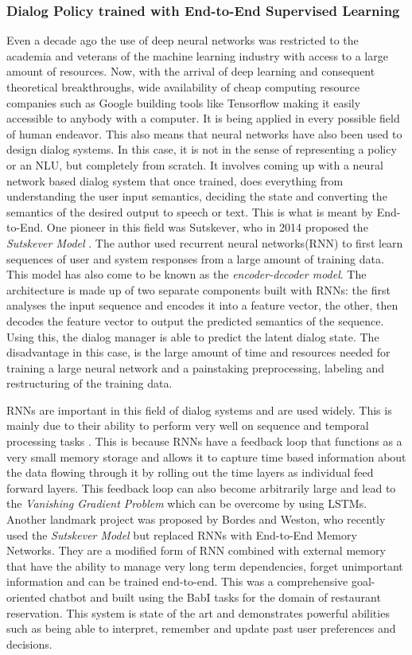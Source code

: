 \documentclass[14pt]{extarticle}
\numberwithin{equation}{section}
\begin{document}
	\subsubsection{Dialog Policy trained with End-to-End Supervised Learning}
	Even a decade ago the use of deep neural networks was restricted to the academia and veterans of the machine learning industry with access to a large amount of resources. Now, with the arrival of deep learning and consequent theoretical breakthroughs, wide availability of cheap computing resource companies such as Google building tools like Tensorflow\cite{tensorflow} making it easily accessible to anybody with a computer. It is being applied in every possible field of human endeavor. This also means that neural networks have also been used to design dialog systems. In this case, it is not in the sense of representing a policy or an NLU, but completely from scratch. It involves coming up with a neural network based dialog system that once trained, does everything from understanding the user input semantics, deciding the state and converting the semantics of the desired output to speech or text. This is what is meant by End-to-End. One pioneer in this field was Sutskever, who in 2014 proposed the \textit{Sutskever Model} \cite{Sutskever_seq_2seq}. The author used recurrent neural networks(RNN) to first learn sequences of user and system responses from a large amount of training data. This model has also come to be known as the \textit{encoder-decoder model}. The architecture is made up of two separate components built with RNNs: the first analyses the input sequence and encodes it into a feature vector, the other, then decodes the feature vector to output the predicted semantics of the sequence. Using this, the dialog manager is able to predict the latent dialog state. The disadvantage in this case, is the large amount of time and resources needed for training a large neural network and a painstaking preprocessing, labeling and restructuring of the training data.
	
	RNNs are important in this field of dialog systems and are used widely. This is mainly due to their ability to perform very well on sequence and temporal processing tasks \cite{karpathy_rnn}. This is because RNNs have a feedback loop that functions as a very small memory storage and allows it to capture time based information about the data flowing through it by rolling out the time layers as individual feed forward layers. This feedback loop can also become arbitrarily large and lead to the \textit{Vanishing Gradient Problem}\cite{hochreiter1998vanishing} which can be overcome by using LSTMs\cite{hochreiter1997long}. Another landmark project was proposed by Bordes and Weston, who recently used the \textit{Sutskever Model} but replaced RNNs with End-to-End Memory Networks\cite{Sukhbaatar_end2end_mem_net}. They are a modified form of RNN combined with external memory that have the ability to manage very long term dependencies, forget unimportant information and can be trained end-to-end. This was a comprehensive goal-oriented chatbot and built using the BabI tasks\cite{babl} for the domain of restaurant reservation\cite{bordes_weston_e2e}. This system is state of the art and demonstrates powerful abilities such as being able to interpret, remember and update past user preferences and decisions.
\end{document}

